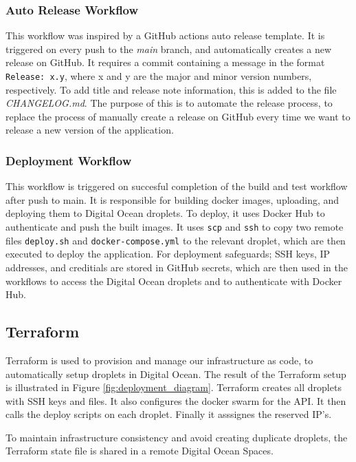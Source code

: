\subsubsection{Auto Release Workflow}
This workflow was inspired by a GitHub actions auto release template\cite{auto-release}.
It is triggered on every push to the \textit{main} branch, and automatically creates a new release on GitHub.
It requires a commit containing a message in the format \texttt{Release: x.y}, where x and y are the major and minor version numbers, respectively.
To add title and release note information, this is added to the file \textit{CHANGELOG.md}.
The purpose of this is to automate the release process, to replace the process of manually create a release on GitHub every time 
we want to release a new version of the application.

\subsubsection{Deployment Workflow}
This workflow is triggered on succesful completion of the build and test workflow after push to main.
It is responsible for building docker images, uploading, and deploying them to Digital Ocean droplets.
To deploy, it uses Docker Hub to authenticate and push the built images.
It uses \texttt{scp} and \texttt{ssh} to copy two remote files \texttt{deploy.sh} and \texttt{docker-compose.yml} to the relevant droplet,
which are then executed to deploy the application.
For deployment safeguards; SSH keys, IP addresses, and creditials are stored in GitHub secrets,
which are then used in the workflows to access the Digital Ocean droplets and to authenticate with Docker Hub.


\subsection{Terraform}
Terraform is used to provision and manage our infrastructure as code, 
to automatically setup droplets in Digital Ocean. 
The result of the Terraform setup is illustrated 
in Figure \ref{fig:deployment_diagram}.
Terraform creates all droplets with SSH keys and files.
It also configures the docker swarm for the API.
It then calls the deploy scripts on each droplet.
Finally it asssignes the reserved IP's.

To maintain infrastructure consistency and avoid creating duplicate droplets,
the Terraform state file is shared in a remote Digital Ocean Spaces.

